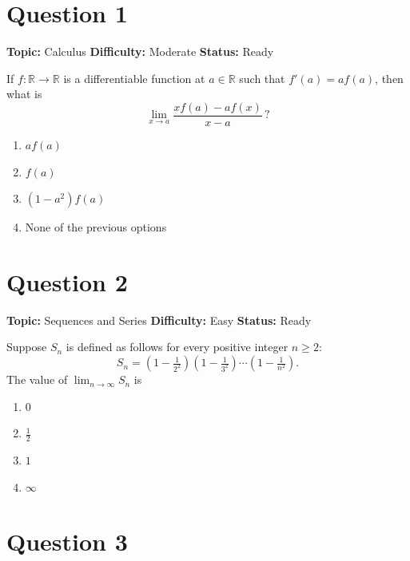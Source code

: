 \documentclass[11pt]{article}
\begin{document}
\newpage
\tableofcontents
\newpage

\section*{Question 1}


\noindent\textbf{Topic:} Calculus \quad \textbf{Difficulty:} Moderate \quad \textbf{Status:} Ready



If $f:\mathbb{R}\to\mathbb{R}$ is a differentiable function at $a\in\mathbb{R}$ such that $f'(a)=af(a)$, then what is
\[
\lim_{x\to a}\frac{xf(a)-af(x)}{x-a}\, ?
\]
\begin{enumerate}[label=(\Alph*)]
\item $af(a)$
\item $f(a)$
\item $(1-a^2)f(a)$
\item None of the previous options
\end{enumerate}

\newpage

\section*{Question 2}


\noindent\textbf{Topic:} Sequences and Series \quad \textbf{Difficulty:} Easy \quad \textbf{Status:} Ready



Suppose $S_n$ is defined as follows for every positive integer $n\ge 2$:
\[
S_n=\left(1-\tfrac{1}{2^2}\right)\!\left(1-\tfrac{1}{3^2}\right)\cdots\!\left(1-\tfrac{1}{n^2}\right).
\]
The value of $\displaystyle\lim_{n\to\infty}S_n$ is
\begin{enumerate}[label=(\Alph*)]
\item $0$
\item $\tfrac{1}{2}$
\item $1$
\item $\infty$
\end{enumerate}

\newpage

\section*{Question 3}

\end{document}
